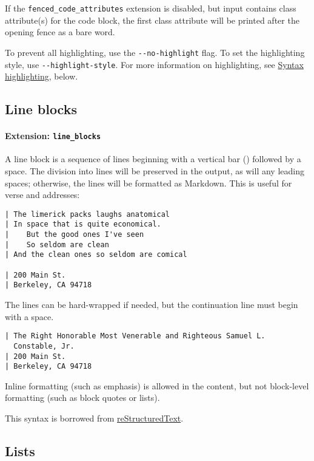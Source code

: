 \documentclass[
]{article}
\begin{document}
If the \texttt{fenced\_code\_attributes} extension is disabled, but
input contains class attribute(s) for the code block, the first class
attribute will be printed after the opening fence as a bare word.

To prevent all highlighting, use the \texttt{-\/-no-highlight} flag. To
set the highlighting style, use \texttt{-\/-highlight-style}. For more
information on highlighting, see \hyperref[syntax-highlighting]{Syntax
highlighting}, below.

\subsection{Line blocks}\label{line-blocks}

\paragraph{\texorpdfstring{Extension:
\texttt{line\_blocks}}{Extension: line\_blocks}}\label{extension-line_blocks}

A line block is a sequence of lines beginning with a vertical bar
(\texttt{\textbar{}}) followed by a space. The division into lines will
be preserved in the output, as will any leading spaces; otherwise, the
lines will be formatted as Markdown. This is useful for verse and
addresses:

\begin{verbatim}
| The limerick packs laughs anatomical
| In space that is quite economical.
|    But the good ones I've seen
|    So seldom are clean
| And the clean ones so seldom are comical

| 200 Main St.
| Berkeley, CA 94718
\end{verbatim}

The lines can be hard-wrapped if needed, but the continuation line must
begin with a space.

\begin{verbatim}
| The Right Honorable Most Venerable and Righteous Samuel L.
  Constable, Jr.
| 200 Main St.
| Berkeley, CA 94718
\end{verbatim}

Inline formatting (such as emphasis) is allowed in the content, but not
block-level formatting (such as block quotes or lists).

This syntax is borrowed from
\href{https://docutils.sourceforge.io/docs/ref/rst/introduction.html}{reStructuredText}.

\subsection{Lists}\label{lists}
\end{document}
